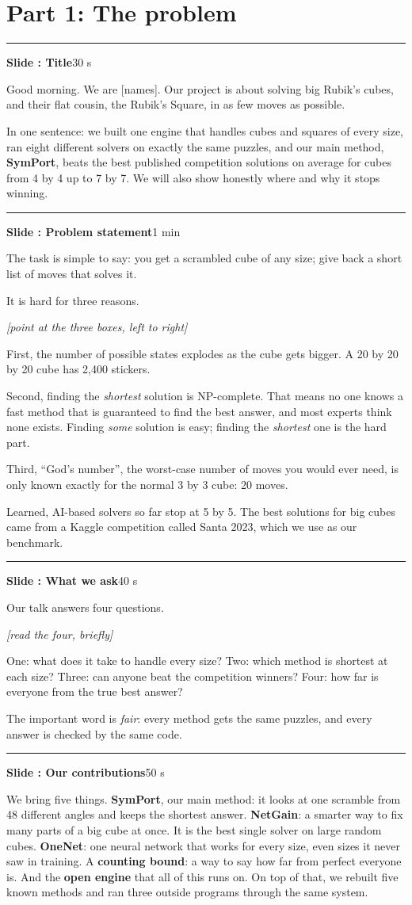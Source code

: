 \documentclass[11pt,a4paper]{article}
\newcounter{slide}
\newcommand{\slide}[2]{\par\bigskip\stepcounter{slide}%
  {\color{NavyBlue}\rule{\linewidth}{0.4pt}}\par
  \textbf{\large Slide \arabic{slide}: #1}\hfill{\small\color{gray}#2}\par}
\newcommand{\act}[1]{\par{\small\color{OliveGreen}\textit{[#1]}}\par}
\begin{document}
\section{Part 1: The problem}

\slide{Title}{30 s}
Good morning. We are [names]. Our project is about solving big Rubik's cubes, and their flat cousin, the Rubik's Square, in
as few moves as possible.

In one sentence: we built one engine that handles cubes and squares of every size, ran eight different solvers on exactly the
same puzzles, and our main method, \textbf{SymPort}, beats the best published competition solutions on average for cubes from
4 by 4 up to 7 by 7. We will also show honestly where and why it stops winning.

\slide{Problem statement}{1 min}
The task is simple to say: you get a scrambled cube of any size; give back a short list of moves that solves it.

It is hard for three reasons. \act{point at the three boxes, left to right}
First, the number of possible states explodes as the cube gets bigger. A 20 by 20 by 20 cube has 2,400 stickers.

Second, finding the \emph{shortest} solution is NP-complete. That means no one knows a fast method that is guaranteed to
find the best answer, and most experts think none exists. Finding \emph{some} solution is easy; finding the \emph{shortest}
one is the hard part.

Third, ``God's number'', the worst-case number of moves you would ever need, is only known exactly for the normal 3 by 3
cube: 20 moves.

Learned, AI-based solvers so far stop at 5 by 5. The best solutions for big cubes came from a Kaggle competition called
Santa 2023, which we use as our benchmark.

\slide{What we ask}{40 s}
Our talk answers four questions. \act{read the four, briefly}
One: what does it take to handle every size? Two: which method is shortest at each size? Three: can anyone beat the competition
winners? Four: how far is everyone from the true best answer?

The important word is \emph{fair}: every method gets the same puzzles, and every answer is checked by the same code.

\slide{Our contributions}{50 s}
We bring five things.
\textbf{SymPort}, our main method: it looks at one scramble from 48 different angles and keeps the shortest answer.
\textbf{NetGain}: a smarter way to fix many parts of a big cube at once. It is the best single solver on large random cubes.
\textbf{OneNet}: one neural network that works for every size, even sizes it never saw in training.
A \textbf{counting bound}: a way to say how far from perfect everyone is.
And the \textbf{open engine} that all of this runs on.
On top of that, we rebuilt five known methods and ran three outside programs through the same system.
\end{document}
